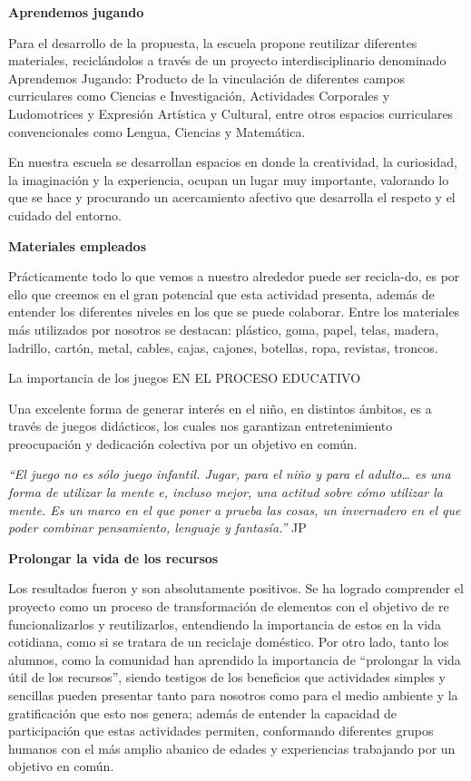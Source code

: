\begin{fullwidth}
\textbf{Aprendemos jugando}

Para el desarrollo de la propuesta, la escuela propone reutilizar
diferentes materiales, reciclándolos a través de un proyecto
interdisciplinario denominado Aprendemos Jugando: Producto de la
vinculación de diferentes campos curriculares como Ciencias e
Investigación, Actividades Corporales y Ludomotrices y Expresión
Artística y Cultural, entre otros espacios curriculares convencionales
como Lengua, Ciencias y Matemática.

En nuestra escuela se desarrollan espacios en donde la creatividad, la
curiosidad, la imaginación y la experiencia, ocupan un lugar muy
importante, valorando lo que se hace y procurando un acercamiento
afectivo que desarrolla el respeto y el cuidado del entorno.

\textbf{Materiales empleados}

Prácticamente todo lo que vemos a nuestro alrededor puede ser
recicla-do, es por ello que creemos en el gran potencial que esta
actividad presenta, además de entender los diferentes niveles en los que
se puede colaborar. Entre los materiales más utilizados por nosotros se
destacan: plástico, goma, papel, telas, madera, ladrillo, cartón, metal,
cables, cajas, cajones, botellas, ropa, revistas, troncos.

\protect\hypertarget{_lfjh5v8ovbq5}{}{}La importancia de los juegos EN
EL PROCESO EDUCATIVO

\protect\hypertarget{_crimm4xjx5j5}{}{}

Una excelente forma de generar interés en el niño, en distintos ámbitos,
es a través de juegos didácticos, los cuales nos garantizan
entretenimiento preocupación y dedicación colectiva por un objetivo en
común.

\emph{``El juego no es sólo juego infantil. Jugar, para el niño y para
el adulto\ldots{} es una forma de utilizar la mente e, incluso mejor,
una actitud sobre cómo utilizar la mente. Es un marco en el que poner a
prueba las cosas, un invernadero en el que poder combinar pensamiento,
lenguaje y fantasía.''} JP

\textbf{Prolongar la vida de los recursos}

Los resultados fueron y son absolutamente positivos. Se ha logrado
comprender el proyecto como un proceso de transformación de elementos
con el objetivo de re funcionalizarlos y reutilizarlos, entendiendo la
importancia de estos en la vida cotidiana, como si se tratara de un
reciclaje doméstico. Por otro lado, tanto los alumnos, como la comunidad
han aprendido la importancia de ``prolongar la vida útil de los
recursos'', siendo testigos de los beneﬁcios que actividades simples y
sencillas pueden presentar tanto para nosotros como para el medio
ambiente y la gratiﬁcación que esto nos genera; además de entender la
capacidad de participación que estas actividades permiten, conformando
diferentes grupos humanos con el más amplio abanico de edades y
experiencias trabajando por un objetivo en común.


\end{fullwidth}
